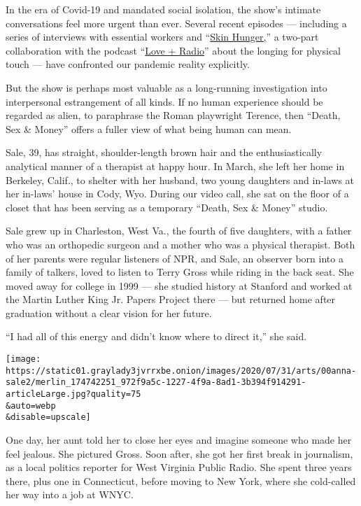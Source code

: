 In the era of Covid-19 and mandated social isolation, the show's
intimate conversations feel more urgent than ever. Several recent
episodes --- including a series of interviews with essential workers and
``\href{https://www.wnycstudios.org/podcasts/deathsexmoney/episodes/skin-hunger-love-radio-part-1}{Skin
Hunger,}'' a two-part collaboration with the podcast
``\href{https://loveandradio.org/}{Love + Radio}'' about the longing for
physical touch --- have confronted our pandemic reality explicitly.

But the show is perhaps most valuable as a long-running investigation
into interpersonal estrangement of all kinds. If no human experience
should be regarded as alien, to paraphrase the Roman playwright Terence,
then ``Death, Sex \& Money'' offers a fuller view of what being human
can mean.

Sale, 39, has straight, shoulder-length brown hair and the
enthusiastically analytical manner of a therapist at happy hour. In
March, she left her home in Berkeley, Calif., to shelter with her
husband, two young daughters and in-laws at her in-laws' house in Cody,
Wyo. During our video call, she sat on the floor of a closet that has
been serving as a temporary ``Death, Sex \& Money'' studio.

Sale grew up in Charleston, West Va., the fourth of five daughters, with
a father who was an orthopedic surgeon and a mother who was a physical
therapist. Both of her parents were regular listeners of NPR, and Sale,
an observer born into a family of talkers, loved to listen to Terry
Gross while riding in the back seat. She moved away for college in 1999
--- she studied history at Stanford and worked at the Martin Luther King
Jr. Papers Project there --- but returned home after graduation without
a clear vision for her future.

``I had all of this energy and didn't know where to direct it,'' she
said.

\texttt{[image: https://static01.graylady3jvrrxbe.onion/images/2020/07/31/arts/00anna-sale2/merlin\_174742251\_972f9a5c-1227-4f9a-8ad1-3b394f914291-articleLarge.jpg?quality=75\\\&auto=webp\\\&disable=upscale]}

One day, her aunt told her to close her eyes and imagine someone who
made her feel jealous. She pictured Gross. Soon after, she got her first
break in journalism, as a local politics reporter for West Virginia
Public Radio. She spent three years there, plus one in Connecticut,
before moving to New York, where she cold-called her way into a job at
WNYC.

